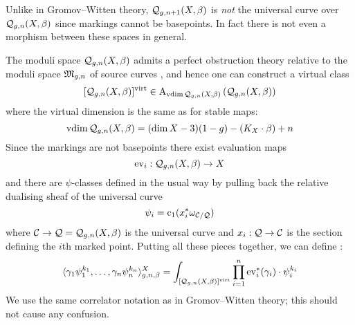 
\begin{remark} Unlike in Gromov--Witten theory, $\mathcal{Q}_{g,n+1}(X,\beta)$ is \emph{not} the universal curve over $\mathcal{Q}_{g,n}(X,\beta)$ since markings cannot be basepoints. In fact there is not even a morphism between these spaces in general.\end{remark}

The moduli space $\mathcal{Q}_{g,n}(X,\beta)$ admits a perfect obstruction theory relative to the moduli space $\mathfrak M_{g,n}$ of source curves \cite[\S 5]{CF-K}, and hence one can construct a virtual class
\begin{equation*} [\mathcal{Q}_{g,n}(X,\beta)]^{\operatorname{virt}} \in \operatorname{A}_{\operatorname{vdim}\mathcal{Q}_{g,n}(X,\beta)} \left( \mathcal{Q}_{g,n}(X,\beta) \right) \end{equation*}
where the virtual dimension is the same as for stable maps:
\begin{equation*} \operatorname{vdim}\mathcal{Q}_{g,n}(X,\beta) = (\dim{X} - 3)(1-g) - (K_X \cdot \beta) + n \end{equation*}
Since the markings are not basepoints there exist evaluation maps
\begin{equation*} \operatorname{ev}_i : \mathcal{Q}_{g,n}(X,\beta) \rightarrow X \end{equation*}
and there are $\psi$-classes defined in the usual way by pulling back the relative dualising sheaf of the universal curve
\begin{equation*} \psi_i = \operatorname{c}_1(x_i^* \omega_{\mathcal{C}/\mathcal{Q}}) \end{equation*}
where $\mathcal{C} \rightarrow \mathcal{Q} = \mathcal{Q}_{g,n}(X,\beta)$ is the universal curve and $x_i : \mathcal{Q} \rightarrow \mathcal{C}$ is the section defining the $i$th marked point. Putting all these pieces together, we can define :
\begin{equation*} \langle \gamma_1 \psi_1^{k_1} , \ldots, \gamma_n \psi_n^{k_n} \rangle_{g,n,\beta}^X = \int_{[\mathcal{Q}_{g,n}(X,\beta)]^{\operatorname{virt}}} \prod_{i=1}^n \operatorname{ev}_i^* (\gamma_i) \cdot \psi_i^{k_i} \end{equation*}
We use the same correlator notation as in Gromov--Witten theory; this should not cause any confusion.

